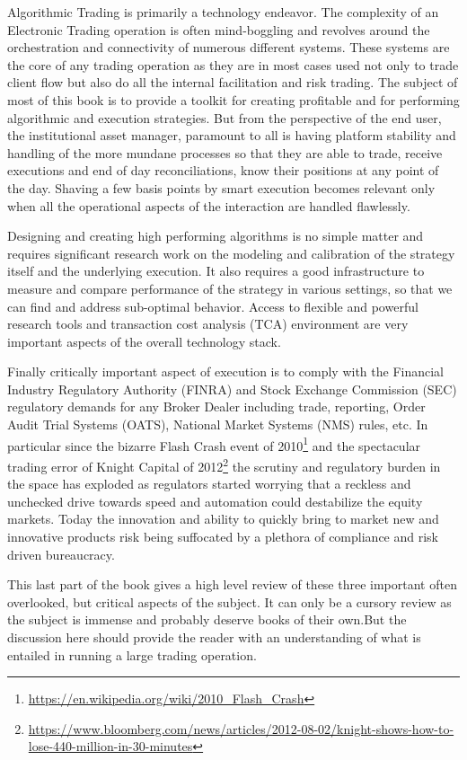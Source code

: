 
Algorithmic Trading is primarily a technology endeavor. The complexity of an Electronic Trading operation is often mind-boggling and revolves around the orchestration and connectivity of numerous different systems. These systems are the core of any trading operation as they are in most cases used not only to trade client flow but also do all the internal facilitation and risk trading. The subject of most of this book is to provide a toolkit for creating profitable and for performing algorithmic and execution strategies. But from the perspective of the end user, the institutional asset manager, paramount to all is having platform stability and handling of the more mundane processes so that they are able to trade, receive executions and end of day reconciliations, know their positions at any point of the day. Shaving a few basis points by smart execution becomes relevant only when all the operational aspects of the interaction are handled flawlessly.


Designing and creating high performing algorithms is no simple matter and requires significant research work on the modeling and calibration of the strategy itself and the underlying execution. It also requires a good infrastructure to measure and compare  performance of the strategy in various settings, so that we can find and address sub-optimal behavior. Access to flexible and powerful research tools and transaction cost analysis (TCA) environment are very important aspects of the overall technology stack.


Finally critically important aspect of execution is to comply with the Financial Industry Regulatory Authority (FINRA) and Stock Exchange Commission (SEC) regulatory demands for any Broker Dealer including trade, reporting, Order Audit Trial Systems (OATS), National Market Systems (NMS) rules, etc. In particular since the bizarre Flash Crash event of 2010\footnote{\url{https://en.wikipedia.org/wiki/2010_Flash_Crash}} and the spectacular trading error of Knight Capital of 2012\footnote{\url{https://www.bloomberg.com/news/articles/2012-08-02/knight-shows-how-to-lose-440-million-in-30-minutes}} the scrutiny and regulatory burden in the space has exploded as regulators started worrying that a reckless and unchecked drive towards speed and automation could destabilize the equity markets. Today the innovation and ability to quickly bring to market new and innovative products risk being suffocated by a plethora of compliance and risk driven bureaucracy. 


This last part of the book gives a high level review of these three important often overlooked, but critical aspects of the subject. It can only be a cursory review as the subject is immense and probably deserve books of their own.But the discussion here should provide the reader with an understanding of what is entailed in running a large trading operation.

 

